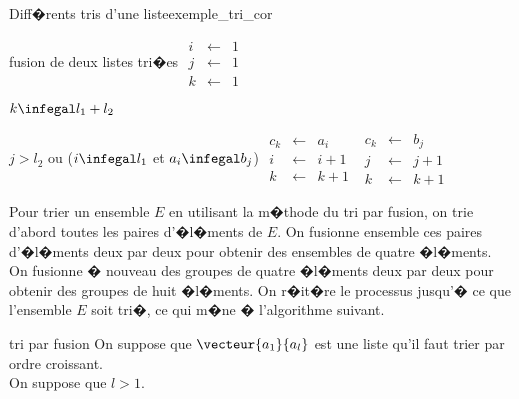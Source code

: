 \begin{xexempleprog2}{Diff�rents tris d'une liste}{exemple_tri_cor}
\begin{xalgorithm}{fusion de deux listes tri�es}
                $\begin{array}{lll}
                i &\longleftarrow& 1 \\ 
                j &\longleftarrow& 1 \\ 
                k &\longleftarrow& 1 
                \end{array}$
                
                \begin{xwhile2}{$k \infegal l_1 + l_2$} 
                        \begin{xif}{$j > l_2$ ou ($i \infegal l_1$ et $a_i \infegal b_j$)}
                            $\begin{array}{lll}
                            c_k &\longleftarrow& a_i \\ 
                            i &\longleftarrow& i + 1 \\ 
                            k &\longleftarrow& k + 1 
                            \end{array}$
                        \xelse
                            $\begin{array}{lll}
                            c_k &\longleftarrow& b_j \\ 
                            j &\longleftarrow& j + 1 \\ 
                            k &\longleftarrow& k + 1 
                            \end{array}$ \\
                        \end{xif} 
                    \end{xwhile2}
                \end{xalgorithm}
                
                
Pour trier un ensemble $E$ en utilisant la m�thode du tri par fusion, on trie d'abord toutes les paires d'�l�ments de $E$. On fusionne ensemble ces paires d'�l�ments deux par deux pour obtenir des ensembles de quatre �l�ments. On fusionne � nouveau des groupes de quatre �l�ments deux par deux pour obtenir des groupes de huit �l�ments. On r�it�re le processus jusqu'� ce que l'ensemble $E$ soit tri�, ce qui m�ne � l'algorithme suivant.


                \begin{xalgorithm}{tri par fusion}\label{algo_tri_fusion}
                On suppose que $\vecteur{a_1}{a_{l}}$ est une liste qu'il faut trier par ordre croissant. \\
                On suppose que $l > 1$.
                

\end{xalgorithm}
\end{xexempleprog2}
